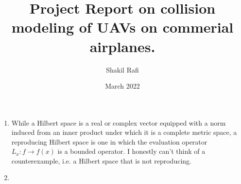 \documentclass{article}
\title{Project Report on collision modeling of UAVs on commerial airplanes.}
\author{Shakil Rafi}
\date{March 2022}
\begin{document}
\begin{enumerate}
    \item While a Hilbert space is a real or complex vector equipped with a norm induced from an inner product under which it is a complete metric space, a reproducing Hilbert space is one in which the evaluation operator $L_x: f \rightarrow f(x)$ is a bounded operator. I honestly can't think of a counterexample, i.e. a Hilbert space that is not reproducing.
    \item 
\end{enumerate}
\end{document}
